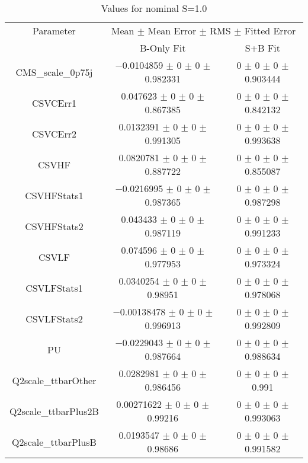 \begin{table}
\centering
\caption{Values for nominal S=1.0}
\begin{tabular}{ccc}
\toprule
Parameter & \multicolumn{2}{c}{Mean $\pm$ Mean Error $\pm$ RMS $\pm$ Fitted Error}\\
 & B-Only Fit & S+B Fit\\
\midrule
CMS\_scale\_0p75j & \num{-0.0104859} $\pm$ \num{0} $\pm$ \num{0} $\pm$ \num{0.982331} & \num{0} $\pm$ \num{0} $\pm$ \num{0} $\pm$ \num{0.903444}\\
CSVCErr1 & \num{0.047623} $\pm$ \num{0} $\pm$ \num{0} $\pm$ \num{0.867385} & \num{0} $\pm$ \num{0} $\pm$ \num{0} $\pm$ \num{0.842132}\\
CSVCErr2 & \num{0.0132391} $\pm$ \num{0} $\pm$ \num{0} $\pm$ \num{0.991305} & \num{0} $\pm$ \num{0} $\pm$ \num{0} $\pm$ \num{0.993638}\\
CSVHF & \num{0.0820781} $\pm$ \num{0} $\pm$ \num{0} $\pm$ \num{0.887722} & \num{0} $\pm$ \num{0} $\pm$ \num{0} $\pm$ \num{0.855087}\\
CSVHFStats1 & \num{-0.0216995} $\pm$ \num{0} $\pm$ \num{0} $\pm$ \num{0.987365} & \num{0} $\pm$ \num{0} $\pm$ \num{0} $\pm$ \num{0.987298}\\
CSVHFStats2 & \num{0.043433} $\pm$ \num{0} $\pm$ \num{0} $\pm$ \num{0.987119} & \num{0} $\pm$ \num{0} $\pm$ \num{0} $\pm$ \num{0.991233}\\
CSVLF & \num{0.074596} $\pm$ \num{0} $\pm$ \num{0} $\pm$ \num{0.977953} & \num{0} $\pm$ \num{0} $\pm$ \num{0} $\pm$ \num{0.973324}\\
CSVLFStats1 & \num{0.0340254} $\pm$ \num{0} $\pm$ \num{0} $\pm$ \num{0.98951} & \num{0} $\pm$ \num{0} $\pm$ \num{0} $\pm$ \num{0.978068}\\
CSVLFStats2 & \num{-0.00138478} $\pm$ \num{0} $\pm$ \num{0} $\pm$ \num{0.996913} & \num{0} $\pm$ \num{0} $\pm$ \num{0} $\pm$ \num{0.992809}\\
PU & \num{-0.0229043} $\pm$ \num{0} $\pm$ \num{0} $\pm$ \num{0.987664} & \num{0} $\pm$ \num{0} $\pm$ \num{0} $\pm$ \num{0.988634}\\
Q2scale\_ttbarOther & \num{0.0282981} $\pm$ \num{0} $\pm$ \num{0} $\pm$ \num{0.986456} & \num{0} $\pm$ \num{0} $\pm$ \num{0} $\pm$ \num{0.991}\\
Q2scale\_ttbarPlus2B & \num{0.00271622} $\pm$ \num{0} $\pm$ \num{0} $\pm$ \num{0.99216} & \num{0} $\pm$ \num{0} $\pm$ \num{0} $\pm$ \num{0.993063}\\
Q2scale\_ttbarPlusB & \num{0.0193547} $\pm$ \num{0} $\pm$ \num{0} $\pm$ \num{0.98686} & \num{0} $\pm$ \num{0} $\pm$ \num{0} $\pm$ \num{0.991582}\\

\end{tabular}
\end{table}
